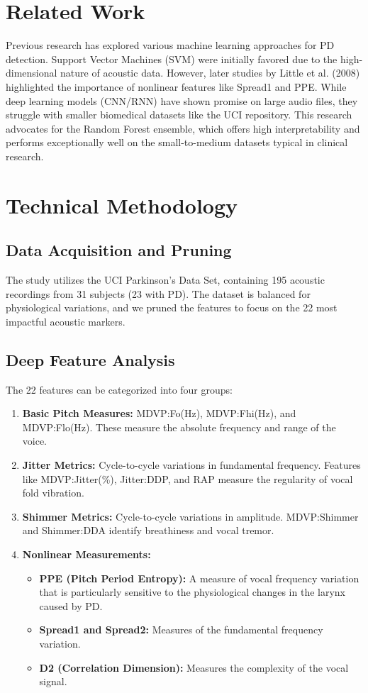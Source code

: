 \documentclass[10pt,journal,compsoc]{IEEEtran}
\begin{document}
\section{Related Work}
Previous research has explored various machine learning approaches for PD detection. Support Vector Machines (SVM) were initially favored due to the high-dimensional nature of acoustic data. However, later studies by Little et al. (2008) highlighted the importance of nonlinear features like Spread1 and PPE. While deep learning models (CNN/RNN) have shown promise on large audio files, they struggle with smaller biomedical datasets like the UCI repository. This research advocates for the Random Forest ensemble, which offers high interpretability and performs exceptionally well on the small-to-medium datasets typical in clinical research.

\section{Technical Methodology}

\subsection{Data Acquisition and Pruning}
The study utilizes the UCI Parkinson’s Data Set, containing 195 acoustic recordings from 31 subjects (23 with PD). The dataset is balanced for physiological variations, and we pruned the features to focus on the 22 most impactful acoustic markers.

\subsection{Deep Feature Analysis}
The 22 features can be categorized into four groups:
\begin{enumerate}
    \item \textbf{Basic Pitch Measures:} MDVP:Fo(Hz), MDVP:Fhi(Hz), and MDVP:Flo(Hz). These measure the absolute frequency and range of the voice.
    \item \textbf{Jitter Metrics:} Cycle-to-cycle variations in fundamental frequency. Features like MDVP:Jitter(\%), Jitter:DDP, and RAP measure the regularity of vocal fold vibration.
    \item \textbf{Shimmer Metrics:} Cycle-to-cycle variations in amplitude. MDVP:Shimmer and Shimmer:DDA identify breathiness and vocal tremor.
    \item \textbf{Nonlinear Measurements:}
    \begin{itemize}
        \item \textbf{PPE (Pitch Period Entropy):} A measure of vocal frequency variation that is particularly sensitive to the physiological changes in the larynx caused by PD.
        \item \textbf{Spread1 and Spread2:} Measures of the fundamental frequency variation.
        \item \textbf{D2 (Correlation Dimension):} Measures the complexity of the vocal signal.
    \end{itemize}
\end{enumerate}
\end{document}
